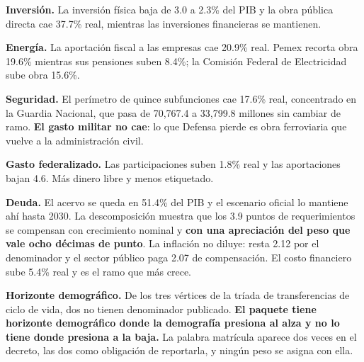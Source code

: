 \textbf{Inversión.} La inversión física baja de 3.0 a 2.3\% del PIB y la obra
pública directa cae 37.7\% real, mientras las inversiones financieras se
mantienen.

\textbf{Energía.} La aportación fiscal a las empresas cae 20.9\% real. Pemex
recorta obra 19.6\% mientras sus pensiones suben 8.4\%; la Comisión Federal de
Electricidad sube obra 15.6\%.

\textbf{Seguridad.} El perímetro de quince subfunciones cae 17.6\% real,
concentrado en la Guardia Nacional, que pasa de 70,767.4 a 33,799.8 millones sin
cambiar de ramo. \textbf{El gasto militar no cae}: lo que Defensa pierde es obra
ferroviaria que vuelve a la administración civil.

\textbf{Gasto federalizado.} Las participaciones suben 1.8\% real y las
aportaciones bajan 4.6. Más dinero libre y menos etiquetado.

\textbf{Deuda.} El acervo se queda en 51.4\% del PIB y el escenario oficial lo
mantiene ahí hasta 2030. La descomposición muestra que los 3.9 puntos de
requerimientos se compensan con crecimiento nominal y \textbf{con una apreciación
del peso que vale ocho décimas de punto}. La inflación no diluye: resta 2.12 por
el denominador y el sector público paga 2.07 de compensación. El costo financiero
sube 5.4\% real y es el ramo que más crece.

\textbf{Horizonte demográfico.} De los tres vértices de la tríada de transferencias
de ciclo de vida, dos no tienen denominador publicado. \textbf{El paquete tiene
horizonte demográfico donde la demografía presiona al alza y no lo tiene donde
presiona a la baja.} La palabra matrícula aparece dos veces en el decreto, las dos
como obligación de reportarla, y ningún peso se asigna con ella.

\clearpage
